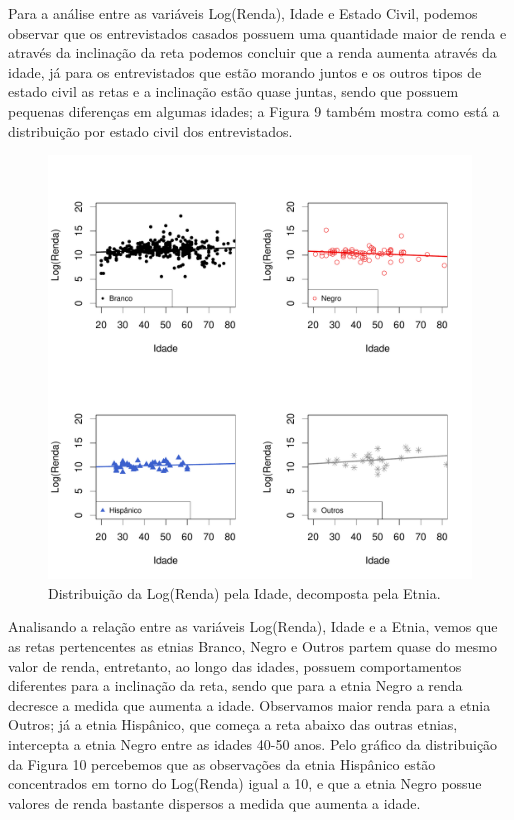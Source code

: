 \documentclass[]{article}
\begin{document}
Para a análise entre as variáveis Log(Renda), Idade e Estado Civil,
podemos observar que os entrevistados casados possuem uma quantidade
maior de renda e através da inclinação da reta podemos concluir que a
renda aumenta através da idade, já para os entrevistados que estão
morando juntos e os outros tipos de estado civil as retas e a inclinação
estão quase juntas, sendo que possuem pequenas diferenças em algumas
idades; a Figura 9 também mostra como está a distribuição por estado
civil dos entrevistados.

\begin{figure}[H]

{\centering \includegraphics[width=0.6\linewidth]{p28-graf} 

}

\caption{Distribuição da Log(Renda) pela Idade, decomposta pela Etnia.}\label{fig:unnamed-chunk-17}
\end{figure}

Analisando a relação entre as variáveis Log(Renda), Idade e a Etnia,
vemos que as retas pertencentes as etnias Branco, Negro e Outros partem
quase do mesmo valor de renda, entretanto, ao longo das idades, possuem
comportamentos diferentes para a inclinação da reta, sendo que para a
etnia Negro a renda decresce a medida que aumenta a idade. Observamos
maior renda para a etnia Outros; já a etnia Hispânico, que começa a reta
abaixo das outras etnias, intercepta a etnia Negro entre as idades 40-50
anos. Pelo gráfico da distribuição da Figura 10 percebemos que as
observações da etnia Hispânico estão concentrados em torno do Log(Renda)
igual a 10, e que a etnia Negro possue valores de renda bastante
dispersos a medida que aumenta a idade.
\end{document}
